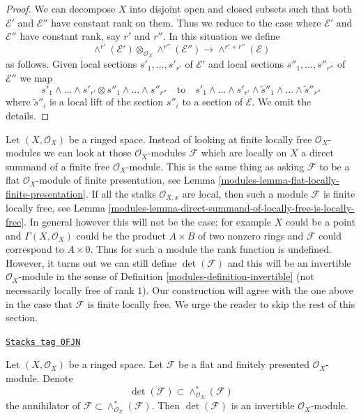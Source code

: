 \begin{proof}
We can decompose $X$ into disjoint open and closed subsets such that
both $\mathcal{E}'$ and $\mathcal{E}''$ have constant rank on them.
Thus we reduce to the case where $\mathcal{E}'$ and $\mathcal{E}''$
have constant rank, say $r'$ and $r''$. In this situation we
define
$$
\wedge^{r'}(\mathcal{E}') \otimes_{\mathcal{O}_X} \wedge^{r''}(\mathcal{E}'')
\longrightarrow
\wedge^{r' + r''}(\mathcal{E})
$$
as follows. Given local sections $s'_1, \ldots, s'_{r'}$ of $\mathcal{E}'$
and local sections $s''_1, \ldots, s''_{r''}$ of $\mathcal{E}''$
we map
$$
s'_1 \wedge \ldots \wedge s'_{r'} \otimes
s''_1 \wedge \ldots \wedge s''_{r''}
\quad\text{to}\quad
s'_1 \wedge \ldots \wedge s'_{r'} \wedge
\tilde s''_1 \wedge \ldots \wedge \tilde s''_{r''}
$$
where $\tilde s''_i$ is a local lift of the section
$s''_i$ to a section of $\mathcal{E}$. We omit the details.
\end{proof}

Let $(X, \mathcal{O}_X)$ be a ringed space. Instead of looking at
finite locally free $\mathcal{O}_X$-modules we can look at those
$\mathcal{O}_X$-modules $\mathcal{F}$ which are locally on $X$
a direct summand of a finite free $\mathcal{O}_X$-module. This is the same
thing as asking $\mathcal{F}$ to be a flat $\mathcal{O}_X$-module of
finite presentation, see Lemma \ref{modules-lemma-flat-locally-finite-presentation}.
If all the stalks $\mathcal{O}_{X, x}$ are local, then such a module
$\mathcal{F}$ is finite locally free, see
Lemma \ref{modules-lemma-direct-summand-of-locally-free-is-locally-free}.
In general however this will not be the case; for
example $X$ could be a point and $\Gamma(X, \mathcal{O}_X)$ could
be the product $A \times B$ of two nonzero rings and $\mathcal{F}$
could correspond to $A \times 0$.
Thus for such a module the rank function is undefined.
However, it turns out we can still define $\det(\mathcal{F})$
and this will be an invertible $\mathcal{O}_X$-module in the sense of
Definition \ref{modules-definition-invertible} (not necessarily locally
free of rank $1$). Our construction will agree with the one above
in the case that $\mathcal{F}$ is finite locally free.
We urge the reader to skip the rest of this section.

\begin{lemma}
\label{modules-lemma-determinant-as-socle}
\href{https://stacks.math.columbia.edu/tag/0FJN}{\texttt{Stacks tag 0FJN}}

Let $(X, \mathcal{O}_X)$ be a ringed space. Let $\mathcal{F}$
be a flat and finitely presented $\mathcal{O}_X$-module.
Denote
$$
\det(\mathcal{F}) \subset
\wedge^*_{\mathcal{O}_X}(\mathcal{F})
$$
the annihilator of $\mathcal{F} \subset \wedge^*_{\mathcal{O}_X}(\mathcal{F})$.
Then $\det(\mathcal{F})$ is an invertible $\mathcal{O}_X$-module.
\end{lemma}

